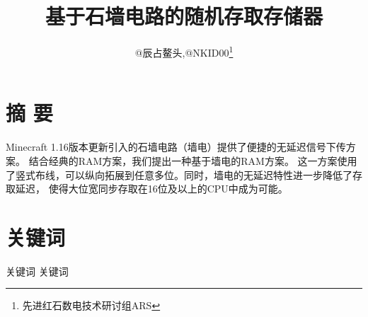 \documentclass[UTF8,12pt,punct=kaiming,fontset=none]{ctexart}
\title{\vspace{-1.5cm}基于石墙电路的随机存取存储器\vspace{-0.5cm}}
\author{@辰占鳌头,@NKID00\thanks{先进红石数电技术研讨组ARS}}
\date{}
\begin{document}
\maketitle
\thispagestyle{fancy} %
\vspace{-0.7cm}

\begin{flushright}
    \begin{minipage}[c]{0.91\linewidth}
        \titleformat{\section}[leftmargin]{\sffamily\small\bfseries}{}{0cm}{}
        \titlespacing{\section}{1.5cm}{1ex}{0cm}

        \section{摘 \hspace{0.105cm} 要}
        \small Minecraft 1.16版本更新引入的石墙电路（墙电）提供了便捷的无延迟信号下传方案。
        结合经典的RAM方案，我们提出一种基于墙电的RAM方案。
        这一方案使用了竖式布线，可以纵向拓展到任意多位。同时，墙电的无延迟特性进一步降低了存取延迟，
        使得大位宽同步存取在16位及以上的CPU中成为可能。

        \section{关键词}
        \small 关键词 \hspace{0.5cm} 关键词
    \end{minipage}
\end{flushright}
\vspace{0.2cm}

\titleformat{\section}[hang]{\large\sffamily\bfseries}{\textmd{\thesection}}{0.5cm}{}
\titlespacing{\section}{0cm}{0.5ex}{0.2ex}
\titleformat{\subsection}[hang]{\normalsize\sffamily}{\textmd{\thesubsection}}{0.5cm}{}
\titlespacing{\subsection}{0cm}{0.5ex}{0.2ex}
\setcounter{section}{0}
\end{document}
